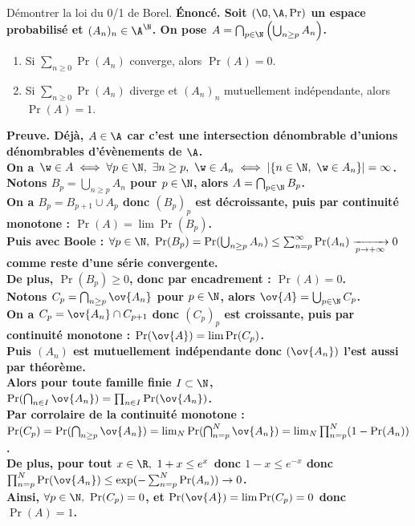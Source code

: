\documentclass[french, 11pt]{article}
\begin{document}
\begin{question}{}{}
    Démontrer la loi du 0/1 de Borel.
    \tcblower
    \bf{Énoncé.} Soit $(\O,\A,\Pr)$ un espace probabilisé et $(A_n)_n\in\A^\N$. On pose $A=\bigcap_{p\in\N}\left( \bigcup_{n\geq p} A_n \right)$.
    \begin{enumerate}
        \item Si $\sum_{n\geq0}\Pr(A_n)$ converge, alors $\Pr(A)=0$.
        \item Si $\sum_{n\geq0}\Pr(A_n)$ diverge et $(A_n)_n$ mutuellement indépendante, alors $\Pr(A)=1$.
    \end{enumerate}
    \bf{Preuve.} Déjà, $A\in\A$ car c'est une intersection dénombrable d'unions dénombrables d'évènements de $\A$.\\
    On a $\w\in A \iff \forall p \in \N, ~ \exists n \geq p, ~ \w \in A_n \iff |\{n\in\N, ~ \w \in A_n\}|=\infty$.\\
     Notons $B_p = \bigcup_{n\geq p}A_n$ pour $p\in\N$, alors $A=\bigcap_{p\in\N}B_p$.\\
    On a $B_{p}=B_{p+1} \cup A_p$ donc $(B_p)_p$ est décroissante, puis par continuité monotone : $\Pr(A)=\lim\Pr(B_p)$.\\
    Puis avec Boole : $\forall p \in \N, ~ \Pr(B_p) = \Pr(\bigcup_{n\geq p}A_n) \leq \sum_{n=p}^{\infty}\Pr(A_n)\xrightarrow[p\to+\infty]{}0$ comme reste d'une série convergente.\\[-0.2cm]
    De plus, $\Pr(B_p)\geq0$, donc par encadrement : $\Pr(A)=0$.\\
     Notons $C_p = \bigcap_{n\geq p}\ov{A_n}$ pour $p\in\N$, alors $\ov{A}=\bigcup_{p\in\N}C_p$.\\
    On a $C_p = \ov{A_n}\cap C_{p+1}$ donc $(C_p)_p$ est croissante, puis par continuité monotone : $\Pr(\ov{A})=\lim\Pr(C_p)$.\\
    Puis $(A_n)$ est mutuellement indépendante donc $(\ov{A_n})$ l'est aussi par théorème.\\
    Alors pour toute famille finie $I\subset \N$, $\Pr(\bigcap_{n\in I}\ov{{A_n}})=\prod_{n\in I}\Pr(\ov{A_n})$.\\
    Par corrolaire de la continuité monotone : $\Pr(C_p)=\Pr(\bigcap_{n\geq p}\ov{A_n})=\lim_N\Pr(\bigcap_{n=p}^N\ov{A_n})=\lim_N \prod_{n=p}^N(1-\Pr(A_n))$.\\
    De plus, pour tout $x\in\R, ~ 1+x\leq e^x$ donc $1-x\leq e^{-x}$ donc $\prod_{n=p}^N\Pr(\ov{A_n})\leq \exp(-\sum_{n=p}^N\Pr(A_n))\to 0$.\\
    Ainsi, $\forall p \in \N, ~ \Pr(C_p)=0$, et $\Pr(\ov{A})=\lim \Pr(C_p) = 0$ donc $\Pr(A)=1$.
\end{question}
\end{document}
